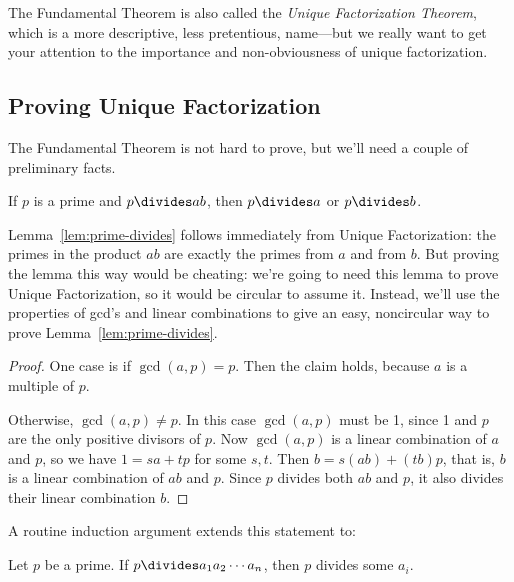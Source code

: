 The Fundamental Theorem is also called the \emph{Unique Factorization
  Theorem}, which is a more descriptive, less pretentious, name---but
we really want to get your attention to the importance and
non-obviousness of unique factorization.

\subsection{Proving Unique Factorization}

The Fundamental Theorem is not hard to prove, but we'll need a couple
of preliminary facts.

\begin{lemma}
\label{lem:prime-divides}
If $p$ is a prime and $p \divides ab$, then $p \divides a$ or $p
\divides b$.
\end{lemma}

Lemma~\ref{lem:prime-divides} follows immediately from Unique
Factorization: the primes in the product $ab$ are exactly the primes
from $a$ and from $b$.  But proving the lemma this way would be
cheating: we're going to need this lemma to prove Unique
Factorization, so it would be circular to assume it.  Instead, we'll
use the properties of gcd's and linear combinations to give an easy,
noncircular way to prove Lemma~\ref{lem:prime-divides}.

\begin{proof}
One case is if $\gcd(a, p) = p$.  Then the claim holds, because $a$ is
a multiple of $p$.

Otherwise, $\gcd(a, p) \neq p$.  In this case $\gcd(a, p)$ must be 1,
since 1 and $p$ are the only positive divisors of $p$.  Now $\gcd(a,
p)$ is a linear combination of $a$ and $p$, so we have $1=sa+tp$ for
some $s,t$.  Then $b =s(ab)+ (tb)p$, that is, $b$ is a linear
combination of $ab$ and $p$.  Since $p$ divides both $ab$ and $p$, it
also divides their linear combination $b$.
\end{proof}

A routine induction argument extends this statement to:\iffalse the
fact we assumed last time:\fi

\begin{lemma}
\label{lem:prime-divides-ind}
Let $p$ be a prime.  If $p \divides a_1 a_2 \cdots a_n$, then $p$
divides some $a_i$.
\end{lemma}

